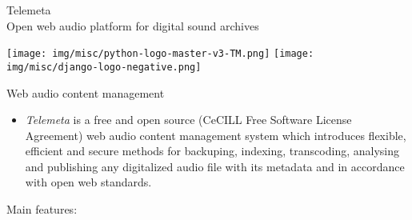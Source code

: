 \documentclass[final, hyperref, table]{beamer}
\begin{document}
\begin{frame}[containsverbatim]{}
\begin{columns}[T]
\begin{column}[T]{.5\linewidth}
      \begin{block}{{\Large Telemeta}\\Open web audio platform for
          digital sound archives}
        \begin{center}
          \begin{center}
            \texttt{[image: img/misc/python-logo-master-v3-TM.png]}\hspace{3cm}
            \texttt{[image: img/misc/django-logo-negative.png]}
          \end{center}

        \begin{minipage}[h]{0.97\linewidth}
          \begin{block}{Web audio content management}
            \begin{itemize}
            \item \emph{Telemeta} is a free and open source
              ({\scriptsize CeCILL Free Software License Agreement})
              web audio content management system which introduces
              \alert{flexible}, efficient and secure methods for \alert{backuping},
              \alert{indexing}, \alert{transcoding}, \alert{analysing}
              and \alert{publishing} any digitalized audio file with
              its metadata and in accordance with \alert{open
                web standards}.
            \end{itemize}

            Main features: \vspace{-0.5cm}
            \begin{multicols}{2}[]
        

\end{multicols}
\end{block}
\end{minipage}
\end{center}
\end{block}
\end{column}
\end{columns}
\end{frame}
\end{document}
